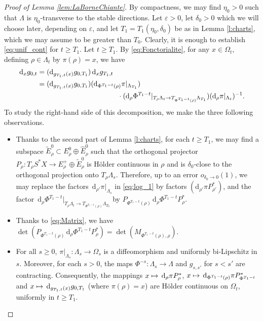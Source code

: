 \documentclass[10pt]{amsart}
\newcommand\mto{\mathchoice{\longmapsto}{\mapsto}{\mapsto}{\mapsto}}
\newcommand{\sd}{\mathrm{d}}
\newcommand{\rd}{\,\mathrm{d}}
\theoremstyle{plain}
\theoremstyle{definition}
\begin{document}
\begin{proof}[Proof of Lemma \ref{lem:LaBorneChiante}]
By compactness, we may find $\eta_0>0$ such that $\Lambda$ is $\eta_0$\nobreakdash-trans\-verse to the stable directions. Let $\varepsilon>0$, let $\delta_0>0$ which we will choose later, depending on $\varepsilon$, and let $T_1=T_1(\eta_0,\delta_0)$ be as in Lemma \ref{l:charts}, which we may assume to be greater than $T_0$. Clearly, it is enough to establish \eqref{eq:unif_cont} for $t\geq T_1$. Let $t\geq T_1$. By \eqref{eq:Fonctorialite}, for any $x\in\Omega_t$, defining $\rho\in\Lambda_t$ by $\pi(\rho)=x$, we have\vspace*{-3pt}
\begin{equation}\label{eq:log_1}
\begin{aligned}
\rd _xg_{0,t}&=(\sd _{g_{T_1,t}(x)}g_{0,T_1}) \rd _xg_{T_1,t}\\
&=(\sd _{g_{T_1,t}(x)}g_{0,T_1}) (\sd _{\Phi^{T_1-t}(\rho)}\pi|_{\Lambda_{T_1}})\\
&\hspace*{4cm}\cdot(\sd _\rho \Phi^{T_1-t}|_{T_\rho\Lambda_t\to T_{\Phi^{T_1-t}(\rho)}\Lambda_{T_1}}) (\sd _\rho\pi|_{\Lambda_t})^{-1}.
\end{aligned}
\end{equation}
To study the right-hand side of this decomposition, we make the three following observations.
\begin{itemize}
\item Thanks to the second part of Lemma \ref{l:charts}, for each $t\geq T_1$, we may find a subspace $\tilde{E}^0_\rho \subset E_\rho^0\oplus \hat{E}_\rho^0$ such that the orthogonal projector $P_\rho:T_\rho S^*X\to E_\rho^+\oplus \tilde{E}_\rho^0$ is Hölder continuous in $\rho$ and is $\delta_0$-close to the orthogonal projection onto $T_\rho\Lambda_s$. Therefore, up to an error $o_{\delta_0\to 0}(1)$, we may replace the factors $\rd _{\rho'}\pi|_{\Lambda_s}$ in \eqref{eq:log_1} by factors $(\sd _{\rho'}\pi P_{\rho'}^*)$, and the factor $\rd _\rho \Phi^{T_1-t}|_{T_\rho\Lambda_t\to T_{\Phi^{T_1-t}(\rho)}\Lambda_{T_0}}$ by $P_{\Phi^{T_1-t}(\rho)}\rd _\rho\Phi^{T_1-t} P_\rho^*$.

\item Thanks to \eqref{eq:Matrix}, we have $\det(P_{\Phi^{T_1-t}(\rho)}\rd _\rho\Phi^{T_1-t} P_\rho^*) = \det(M_{\Phi^{T_1-t}(\rho), \rho})$.

\item For all $s\geq 0$, $\pi|_{\Lambda_s}:\Lambda_s\to \Omega_s$ is a diffeomorphism and uniformly bi-Lipschitz in $s$. Moreover, for each $s>0$, the maps $\Phi^{-s}:\Lambda_s\to\Lambda$ and $g_{s,s'}$ for $s<s'$ are contracting. Consequently, the mappings $x\mto \rd _\rho\pi P_\rho^*$, $x\mto \rd _{\Phi^{T_1-t}(\rho)}\pi P_{\Phi^{T_1-t}}^*$ and $x\mto \rd _{g_{T_1,t}(x)}g_{0,T_1}$ (where $\pi(\rho)=x$) are Hölder continuous on $\Omega_t$, uniformly in $t\geq T_1$.
\end{itemize}


\end{proof}
\end{document}
